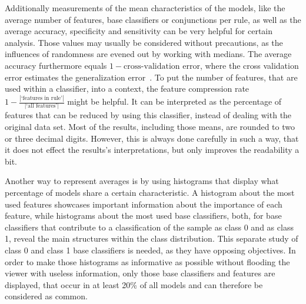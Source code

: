 Additionally measurements of the mean characteristics of the models, like the average number of features,
base classifiers or conjunctions per rule, as well as the average accuracy, specificity and sensitivity can be very helpful for certain analysis.
Those values may usually be considered without precautions, as the influences of randomness are evened out by working with medians.
The average accuracy furthermore equals \(1 - \text{cross-validation error}\), where the
cross validation error estimates the generalization error~\citep{muessel}.
To put the number of features, that are used within a classifier, into a context,
the feature compression rate \(1-\frac{|\text{`features in rule'}|}{|\text{`all features'}|}\) might be helpful.
It can be interpreted as the percentage of features that can be reduced by using this
classifier, instead of dealing with the original data set.
Most of the results, including those means, are rounded to two or three decimal digits.
However, this is always done carefully in such a way, that it does not effect the results's interpretations, but only improves the readability a bit.

Another way to represent averages is by using histograms that display what percentage of models share a certain characteristic.
A histogram about the most used features showcases important information about the importance of each feature,
while histograms about the most used base classifiers, both, for base classifiers that contribute to a classification
of the sample as class 0 and as class 1, reveal the main structures within the class distribution.
This separate study of class 0 and class 1 base classifiers is needed, as they have opposing objectives.
In order to make those histograms as informative as possible without flooding the viewer with useless
information, only those base classifiers and features are displayed, that occur in at least 20\% of all
models and can therefore be considered as common.